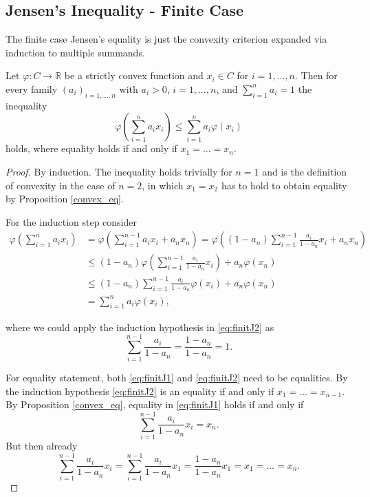 
\subsection{Jensen's Inequality - Finite Case}

The finite case Jensen's equality is just the convexity criterion expanded via induction to multiple summands.

\begin{proposition}
  Let $\varphi: C \to \mathbb{R}$ be a strictly convex function and $x_i \in C$ for $i=1,\dots,n$. Then for every family $(a_i)_{i=1,...,n}$ with $a_i > 0$, $i=1,\dots,n$, and $\sum_{i=1}^{n} a_i = 1$ the inequality
  \[
  \varphi\left(\sum_{i=1}^{n} a_i x_i\right) \leq \sum_{i=1}^{n} a_i \varphi(x_i)
  \]
  holds, where equality holds if and only if $x_1 = \ldots = x_n$.
\end{proposition}

\begin{proof}
  By induction. The inequality holds trivially for $n=1$ and is the definition of convexity in the case of $n=2$, in which $x_1 = x_2$ has to hold to obtain equality by Proposition \ref{convex_eq}.

  For the induction step consider
  \begin{align}
    \varphi\left(\sum_{i=1}^{n} a_i x_i\right) &= \varphi\left( \sum_{i=1}^{n-1} a_ix_i + a_n x_n \right) = \varphi\left( (1-a_n) \sum_{i=1}^{n-1} \frac{a_i}{1-a_n}x_i + a_n x_n \right) \nonumber \\
    & \leq (1-a_n) \varphi\left( \sum_{i=1}^{n-1} \frac{a_i}{1-a_n} x_i
    \right) + a_n \varphi(x_n) \label{eq:finitJ1} \\ & \leq (1 - a_n) \sum_{i=1}^{n-1}  \frac{a_i}{1-a_n} \varphi(x_i) + a_n \varphi(x_n) \label{eq:finitJ2} \\
     &= \sum_{i=1}^{n} a_i \varphi(x_i), \nonumber
  \end{align}

  where we could apply the induction hypothesis in \ref{eq:finitJ2} as
  \[
  \sum_{i=1}^{n-1}  \frac{a_i}{1-a_n} = \frac{1-a_n}{1-a_n} = 1.
  \]

  For equality statement, both \ref{eq:finitJ1} and \ref{eq:finitJ2} need to be equalities. By the induction hypothesis \ref{eq:finitJ2} is an equality if and only if $x_1 = \ldots = x_{n-1}$.  By Proposition \ref{convex_eq}, equality in \ref{eq:finitJ1} holds if and only if
  \[
  \sum_{i=1}^{n-1} \frac{a_i}{1-a_n} x_i = x_n.
  \]
  But then already
  \[
  \sum_{i=1}^{n-1} \frac{a_i}{1-a_n} x_i = \sum_{i=1}^{n-1} \frac{a_i}{1-a_n} x_1 = \frac{1-a_n}{1-a_n} x_1 = x_1 = \ldots = x_n.
  \]
  
\end{proof}
